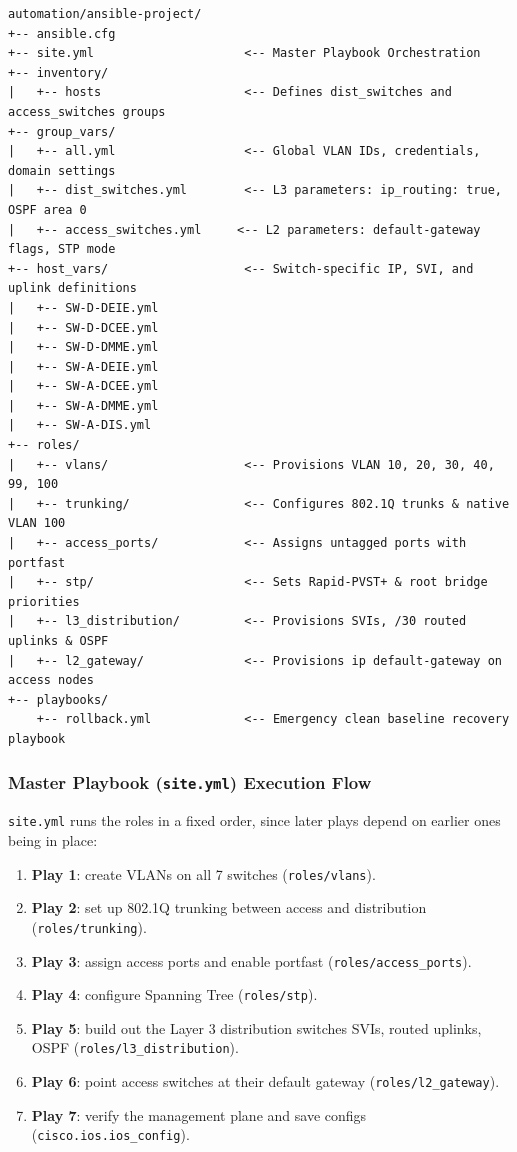 \documentclass[11pt,a4paper]{article}
\begin{document}
\begin{lstlisting}[style=console, caption={Ansible Role-Based Project Directory Structure}]
automation/ansible-project/
+-- ansible.cfg
+-- site.yml                     <-- Master Playbook Orchestration
+-- inventory/
|   +-- hosts                    <-- Defines dist_switches and access_switches groups
+-- group_vars/
|   +-- all.yml                  <-- Global VLAN IDs, credentials, domain settings
|   +-- dist_switches.yml        <-- L3 parameters: ip_routing: true, OSPF area 0
|   +-- access_switches.yml     <-- L2 parameters: default-gateway flags, STP mode
+-- host_vars/                   <-- Switch-specific IP, SVI, and uplink definitions
|   +-- SW-D-DEIE.yml
|   +-- SW-D-DCEE.yml
|   +-- SW-D-DMME.yml
|   +-- SW-A-DEIE.yml
|   +-- SW-A-DCEE.yml
|   +-- SW-A-DMME.yml
|   +-- SW-A-DIS.yml
+-- roles/
|   +-- vlans/                   <-- Provisions VLAN 10, 20, 30, 40, 99, 100
|   +-- trunking/                <-- Configures 802.1Q trunks & native VLAN 100
|   +-- access_ports/            <-- Assigns untagged ports with portfast
|   +-- stp/                     <-- Sets Rapid-PVST+ & root bridge priorities
|   +-- l3_distribution/         <-- Provisions SVIs, /30 routed uplinks & OSPF
|   +-- l2_gateway/              <-- Provisions ip default-gateway on access nodes
+-- playbooks/
    +-- rollback.yml             <-- Emergency clean baseline recovery playbook
\end{lstlisting}

\subsubsection{Master Playbook (\texttt{site.yml}) Execution Flow}
\texttt{site.yml} runs the roles in a fixed order, since later plays depend on earlier ones being in place:
\begin{enumerate}
    \item \textbf{Play 1}: create VLANs on all 7 switches (\texttt{roles/vlans}).
    \item \textbf{Play 2}: set up 802.1Q trunking between access and distribution (\texttt{roles/trunking}).
    \item \textbf{Play 3}: assign access ports and enable portfast (\texttt{roles/access\_ports}).
    \item \textbf{Play 4}: configure Spanning Tree (\texttt{roles/stp}).
    \item \textbf{Play 5}: build out the Layer 3 distribution switches SVIs, routed uplinks, OSPF (\texttt{roles/l3\_distribution}).
    \item \textbf{Play 6}: point access switches at their default gateway (\texttt{roles/l2\_gateway}).
    \item \textbf{Play 7}: verify the management plane and save configs (\texttt{cisco.ios.ios\_config}).
\end{enumerate}
\end{document}
